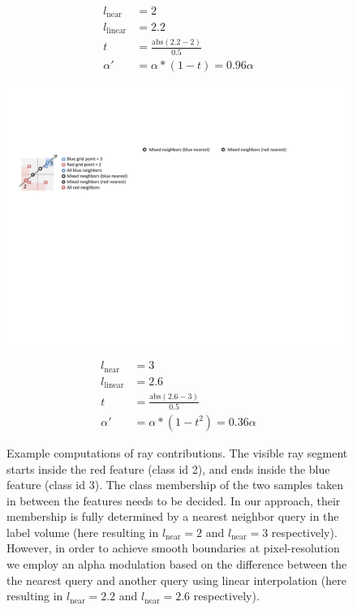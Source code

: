 \documentclass{egpubl}
\begin{document}
\begin{figure}
\begin{minipage}{0.27\linewidth}
\begin{minipage}{1.0\linewidth}
\end{minipage}
\begin{minipage}{1.0\linewidth}
\begin{align}
l_\mathrm{near} &= 2\nonumber\\
l_\mathrm{linear} &= 2.2\nonumber\\
t &= \frac{\mathrm{abs}(2.2-2)}{0.5}\nonumber\\
\alpha' &= \alpha * (1-t) = 0.96 \alpha\nonumber
\end{align}
\end{minipage}
\end{minipage}\hfill
\begin{minipage}{0.27\linewidth}
\begin{minipage}{1.0\linewidth}
\includegraphics[width=1.0\linewidth]{figures/Neighborhood_blue}
\end{minipage}
\begin{minipage}{1.0\linewidth}
\begin{align}
l_\mathrm{near} &= 3\nonumber\\
l_\mathrm{linear} &= 2.6\nonumber\\
t &= \frac{\mathrm{abs}(2.6-3)}{0.5}\nonumber\\
\alpha' &= \alpha * (1-t^2) = 0.36 \alpha\nonumber
\end{align}
\end{minipage}
\end{minipage}
\caption{\label{fig:example-illustration}
Example computations of ray contributions. The visible ray segment starts inside the red feature (class id 2), and ends inside the blue feature (class id 3). The class membership of the two samples taken in between the features needs to be decided. In our approach, their membership is fully determined by a nearest neighbor query in the label volume (here resulting in $l_\mathrm{near}=2$ and $l_\mathrm{near}=3$ respectively). However, in order to achieve smooth boundaries at pixel-resolution we employ an alpha modulation based on the difference between the the nearest query and another query using linear interpolation (here resulting in $l_\mathrm{near}=2.2$ and $l_\mathrm{near}=2.6$ respectively). 
}
\end{figure}
\end{document}
